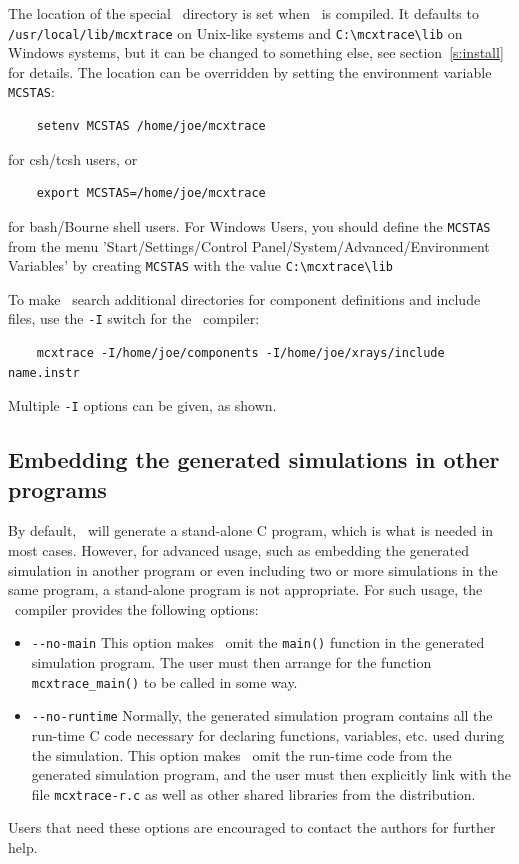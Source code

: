 The location of the special \MCX\ directory is set when \MCX\ is
compiled. It defaults to \verb+/usr/local/lib/mcxtrace+ on Unix-like systems and \verb+C:\mcxtrace\lib+ on Windows systems, but it can be
changed to something else, see section~\ref{s:install} for
details. The location can be overridden by setting the environment
variable \verb+MCSTAS+: 
\begin{verbatim}
    setenv MCSTAS /home/joe/mcxtrace
\end{verbatim}
for csh/tcsh users, or
\begin{verbatim}
    export MCSTAS=/home/joe/mcxtrace
\end{verbatim}
for bash/Bourne shell users.
For Windows Users, you should define the \verb+MCSTAS+ from the menu 'Start/Settings/Control Panel/System/Advanced/Environment
Variables' by creating \verb+MCSTAS+ with the value \verb+C:\mcxtrace\lib+

To make \MCX\ search additional directories for component definitions
and include files, use the \verb+-I+ switch for the \MCX\ compiler:
\begin{verbatim}
    mcxtrace -I/home/joe/components -I/home/joe/xrays/include name.instr
\end{verbatim}
Multiple \verb+-I+ options can be given, as shown.


\subsection{Embedding the generated simulations in other programs}

By default, \MCX\ will generate a stand-alone C program, which is what
is needed in most cases. However, for advanced usage, such as embedding
the generated simulation in another program or even including two or
more simulations in the same program, a stand-alone program is not
appropriate. For such usage, the \MCX\ compiler provides the following
options:
\begin{itemize}
\item \verb+--no-main+ This option makes \MCX\ omit the \verb+main()+
  function in the generated simulation program. The user must then
  arrange for the function \verb+mcxtrace_main()+ to be called in some
  way.
\item \verb+--no-runtime+ Normally, the
  generated simulation program contains all the run-time C code necessary for
  declaring functions, variables, etc. used during the simulation.  This
  option makes \MCX\ omit the run-time code from the generated
  simulation program, and the user must then explicitly link with the file
  \verb+mcxtrace-r.c+ as well as other shared libraries from the \MCX{} distribution.
\end{itemize}
Users that need these options are encouraged to contact the authors for
further help.



